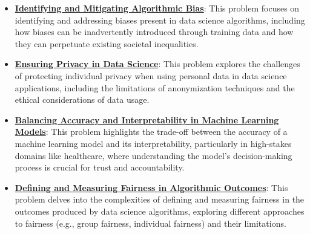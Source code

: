 \documentclass{article}%
\begin{document}
\begin{itemize}[leftmargin=*]%
\item \href{https://purdue.brightspace.com/d2l/common/assets/pdfjs-d2l-dist/1.0.14-legacy/web/viewer.html?file=\%2Fcontent\%2Fenforced\%2F1095465-WL.202510.CS24200.LE1\%2F25-ethics.pdf\%3Fou\%3D1095465\&lang=en-us\&container=d2l-fileviewer-rendered-pdf\&fullscreen=d2l-fileviewer-rendered-pdf-dialog\&height=667#page=2}{\textbf{Identifying and Mitigating Algorithmic Bias}}: This problem focuses on identifying and addressing biases present in data science algorithms, including how biases can be inadvertently introduced through training data and how they can perpetuate existing societal inequalities.%
\item \href{https://purdue.brightspace.com/d2l/common/assets/pdfjs-d2l-dist/1.0.14-legacy/web/viewer.html?file=\%2Fcontent\%2Fenforced\%2F1095465-WL.202510.CS24200.LE1\%2F25-ethics.pdf\%3Fou\%3D1095465\&lang=en-us\&container=d2l-fileviewer-rendered-pdf\&fullscreen=d2l-fileviewer-rendered-pdf-dialog\&height=667#page=8}{\textbf{Ensuring Privacy in Data Science}}: This problem explores the challenges of protecting individual privacy when using personal data in data science applications, including the limitations of anonymization techniques and the ethical considerations of data usage.%
\item \href{https://purdue.brightspace.com/d2l/common/assets/pdfjs-d2l-dist/1.0.14-legacy/web/viewer.html?file=\%2Fcontent\%2Fenforced\%2F1095465-WL.202510.CS24200.LE1\%2F25-ethics.pdf\%3Fou\%3D1095465\&lang=en-us\&container=d2l-fileviewer-rendered-pdf\&fullscreen=d2l-fileviewer-rendered-pdf-dialog\&height=667#page=27}{\textbf{Balancing Accuracy and Interpretability in Machine Learning Models}}: This problem highlights the trade-off between the accuracy of a machine learning model and its interpretability, particularly in high-stakes domains like healthcare, where understanding the model's decision-making process is crucial for trust and accountability.%
\item \href{https://purdue.brightspace.com/d2l/common/assets/pdfjs-d2l-dist/1.0.14-legacy/web/viewer.html?file=\%2Fcontent\%2Fenforced\%2F1095465-WL.202510.CS24200.LE1\%2F25-ethics.pdf\%3Fou\%3D1095465\&lang=en-us\&container=d2l-fileviewer-rendered-pdf\&fullscreen=d2l-fileviewer-rendered-pdf-dialog\&height=667#page=24}{\textbf{Defining and Measuring Fairness in Algorithmic Outcomes}}: This problem delves into the complexities of defining and measuring fairness in the outcomes produced by data science algorithms, exploring different approaches to fairness (e.g., group fairness, individual fairness) and their limitations.%
\end{itemize}
\end{document}
